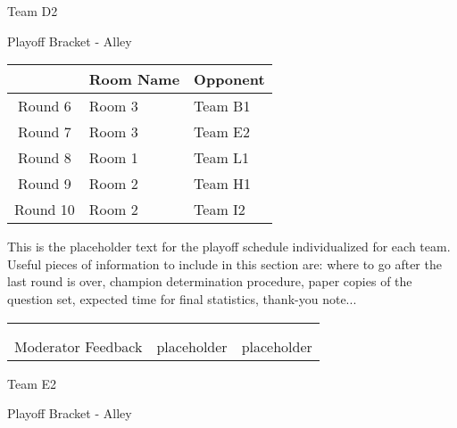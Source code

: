 \documentclass{article}%
\begin{document}
\newpage%
\begin{center}%
\begin{Huge}%
Team D2%
\end{Huge}%
\vspace*{12pt}%
\linebreak%
\begin{Large}%
Playoff Bracket {-} Alley%
\end{Large}%
\end{center}%
\vspace*{4pt}%
%
\begin{tabularx}{\textwidth}{|c|Y|Y|}%
\hline%
&Room Name&Opponent\\%
\hline%
Round 6&Room 3&Team B1\\%
Round 7&Room 3&Team E2\\%
Round 8&Room 1&Team L1\\%
Round 9&Room 2&Team H1\\%
Round 10&Room 2&Team I2\\%
\hline%
\end{tabularx}%
\vspace*{30pt}%
\linebreak%
This is the placeholder text for the playoff schedule individualized for each team. Useful pieces of information to include in this section are: where to go after the last round is over, champion determination procedure, paper copies of the question set, expected time for final statistics, thank{-}you note...%
\vspace*{30pt}%
\newline%
%
\begin{tabularx}{\textwidth}{YYY}%
  &  &  \\%
\\%
Moderator Feedback&placeholder&placeholder\\%
\end{tabularx}%
\newpage%
\begin{center}%
\begin{Huge}%
Team E2%
\end{Huge}%
\vspace*{12pt}%
\linebreak%
\begin{Large}%
Playoff Bracket {-} Alley%
\end{Large}%
\end{center}%
\end{document}

